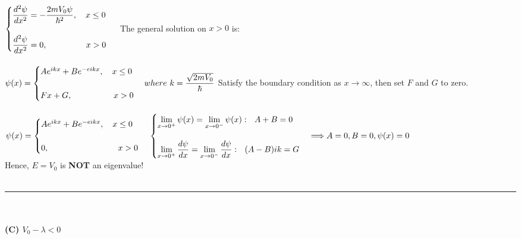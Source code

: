 \documentclass[fleqn]{article}
\begin{document}
{      \\
      $
        \begin{cases}
          \dfrac{d^2 \psi}{dx^2}=-\dfrac{2mV_0 \psi}{\hbar^2}, ~~~ x \leq 0 \\
          \\
          \dfrac{d^2 \psi}{dx^2}=0, ~~~~~~~~~~~~~~ x>0
        \end{cases} \\ 
      $
      The general solution on $x>0$ is: \\
      \\
      $
        \psi(x)=\begin{cases}
          A e^{ikx}+B e^{-eikx}, ~~~ x \leq 0 \\
          \\
          Fx+G, ~~~~~~~~~~~~~~~ x>0
        \end{cases} where ~ k=\dfrac{\sqrt{2mV_0}}{\hbar} \\ \\
      $ 
      Satisfy the boundary condition as $x \rightarrow \infty$, then set $F$ and $G$ to zero. \\ 
      \\
      $
        \psi(x)=\begin{cases}
          A e^{ikx}+B e^{-eikx}, ~~~ x \leq 0 \\
          \\
          0, ~~~~~~~~~~~~~~~~~~~~~~~~~ x>0
        \end{cases} \\
        \\
        \\
        \begin{cases}
          \lim\limits_{x\to 0^+} \psi(x)=\lim\limits_{x\to 0^-} \psi(x): ~~ A+B=0 \\
          \\
          \lim\limits_{x\to 0^+} \dfrac{d \psi}{dx}=\lim\limits_{x\to 0^-} \dfrac{d\psi}{dx}: ~~ (A-B)ik=G
        \end{cases} \Longrightarrow A=0, B=0, \psi(x)=0 \\ \\
      $ \\ 
      Hence, $E=V_0$ is \textbf{NOT} an eigenvalue! \\
      \\
      \rule{15cm}{1pt}
      \\
      \\
      \textbf{(C) $V_0-\lambda<0$} \\
}
\end{document}
